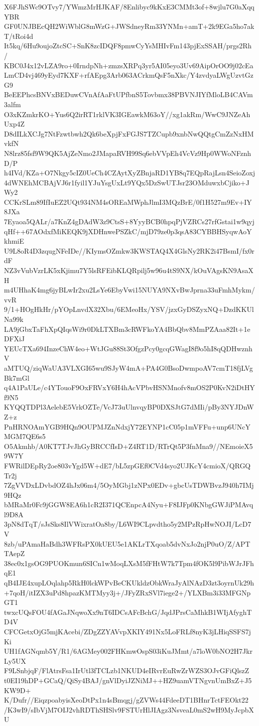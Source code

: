 X6FJhSWc9OTvy7/YWmzMrHJKAF/8Enlibyc9kKxE3CMMt3of+8wjlu7G0aXqqYBR
GF0UNJBEcQH2WiWblG8mWzG+JWSdneyRm33YNMn+amT+2k9EGa5ho7akT/tRoi4d
It5kq/6Hu9oujoZtcSC+SnK8zcIDQF8pmwCyYsMHIvFm143pjExSSAH/prgs2Rh/
KBC0J4x12vLZA9ro+0IrndpNh+zmzsXRPq3yr5AI05eyo3Uv69AipOrOO9j02cEa
LmCD4vj469yEyd7KXF+rfAEpg3Arb063ACrkmQsF5nXkc/Y4zvdyaLWgUzvtGzG9
BeEEPhcsBNVxBEDuwCVnAfAaFtUPfbnS5Tovbmx38PBVNJIYfMloLB4CAVm3alfm
O3xKZmkrKO+Yus6Q2irRT1rklVK3IGEawkM63oY//xg1akRm/WwC9JNZeAhUxp4Z
D8dILkXCJg7NtFzwtbwh2Qk6beXpjFxFGJS7TZCupb9xnbNwQQtgCmZzNxHMvkfN
N8lrz85fsf9W9QK5AjZeNmo2JMapaRVH99Sq6ebVVpEh4VcVz9Hp0WWoNFznhD/P
h4IVd/KZa+O7Nkgy5cIZ0UeCh4CZAytXyZBnjaRD1YB8q7EQpRajLsn4SeioZoxj
4dWNEhMCBAjVJ6r1fyil1YJuYsgUxLt9YQx5DzSwUTJsr23OMduwxbCjiko+JWy2
CCKrSLm89IfIuEZ2UQt934NM4sOREaMWphJlmI3MQzBrE/0f1H527m9Ev+IY8JXa
7Eyaoa5QALr/a7KnZ4gDAdW3z9CtsS+8YyyBCB0hpqPjVZRCs27rfGstai1w9qyj
qHf++67AOdxfMiKEQK9jXDHnwePSZkC/mjD79ze0p3qsA83CYBBHSyqwAoYkhmiE
U9L8oR4D3zqugNFeIDe//KIymsOZmkw3KWSTAQ4X4GlsNy2RK2i47BsmI/fx0rdF
NZ3vVubVzrLK5xKjimu7Y5lsRFEibKLQRpilj5w96u4tS9NX/kOuVAgsKN9AsaXH
m4UHhaK4mg6jyBLwIr2xu2LsYe6EbyVwi15NUYA9NXvBwJprna33uFmhMykm/vvR
9/1+HOgHkHr/pYOpLnvdX32Xbu/6EMeoHx/YSV/jzxGyDSZyxNQ+DzdKKUlNa99k
LA9jGbxTaFhXpQIqsWi9r0DkLTXBm3cRWFkoYA4BbQbv8MmPZAaa82It+1eDFXiJ
YEUcTXa694InzeChW4eo+WtJGu88St3OfgzPcy0gcqGWagI8f9o5hI8qQDHwznhV
aMTUQ/ziqWaUA3VLXGI65wu9SJyW4mA+PA4G0BsoDwmpoAV7cmT18fjLVgBk7mGl
q4A1PaULe/c4YTouoF9OxFRVxY6H4hAcVPbvHSNMnofv8mOS2P0KvN2iDtHYf9N5
KYQQTDPl3AelebE5VrkOZTe/VcJ73uUlnvqyBP0DXSJtG7dMIi/pBy3NYJDnWZ+z
PnHRNOAmYGB9HQn9OUPMJZnNdxjY72EYNP1cC05p1mVFFu+unp6UNcYMGM7QE6s5
O5Akmhb/A0KT7TJvJhGyBRCCfIsD+Z4RT1D/RTrQt5P3fnMna9//NEmoieX59W7Y
FWRilDEpRy2oe803vYgd5W+dE7/bL5zpGEf0CVd4syo2UJKcY4cmioX/QRGQTr2j
7ZgVVDxLDvbdOZ4hJx06m4/5OyMGbj1zNPx0EDv+gbcUsTDWBvzJ940h7IMj9HQz
bMRaMr0Fc9jGGW8EA6h1cR2I371QCEnpcA4Nyu+F8IJFp0KNbgGWJiPMAvql9D8A
3pN8dTqT/sJsSks8IlVWixratOa8by/L6WI9CLpvdtho5y2MPzRpHwNOJI/LcD7V
8zb/uPAmaHaBdh3WFRsPX0kUEU5e1AKLrTXqoab5dvNxJo2njP0uO/Z/APTTAepZ
38ec0x1gsOG9PUOKmun6SICn1wMoqLXsM5fFHtW7k7Tpm4fOK5l9PibWJrJFhqE1
qB4IJE4xupLOqlahp5RkH0lckWPvBeCKUkldzObkWraJyAlNAzD3zt3oyrnUk29h
+7qoH/itIZX3uPd8hpazKMTMyy3j+/JFyZRxSVl7iege2+/YLXBm3i33MFGNpGT1
twxcUQsFOU4fAGaJNqwoXx9nT6IDCsAFcBchG/JqdJPrsCaMhkB1WIjAfyghTD4V
CFCGetxOjG5mjKAcebi/ZDgZZYAVvpXKIY491Nx5LoFRLf8nyK3jLHiqSSFS7jKi
UH1fAGNqmb5Y/R1/6AGMey002FHKmwOspS03iKuJMmt/a7loW0bNO2H7JkrLy5UX
F9LSnbjqF/FlAtrsFsa1IrUtl3fTCLzb1NKUD4eIRvrEuRwZrWZS3OJvGFiQlszZ
t0EI19hDP+GCaQ/QiSy4BAJ/gnVlDyiJZNiMJ++HZ9uamVTNgvnUmBxZ+J5KW9D+
K/Dufr//EiqzpoabyisXeoDtPx1n4sBmqgj/gZVWs44FdeeDT1BHnrTctFEOkt22
/K3wI9/sIbVjM7OIJ2vhRDThSHSlv9FSTUrHlJIAgz3NsveaL0mS2wH9MyJcpbXU
